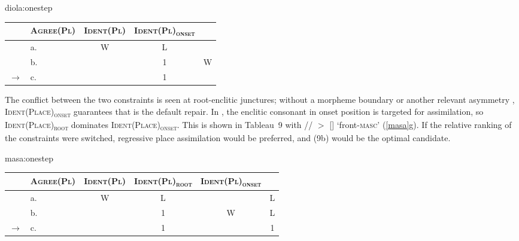 \documentclass[output=paper]{LSP/langsci}
\begin{document}
\begin{table}[ht]
    		{diola:onestep}
    \begin{tabular}{|rl||c|c:c|} \hline
     &
    	\textsc{Agree(Pl)} &
        \textsc{Ident(Pl)} &
        \textsc{Ident(Pl)\textsubscript{onset}}\\
    \hline \hline
	      & a.         & W & L &   \\ \hline
          & b.         &   & 1 & W \\ \hline
    $\to$ & c.         &   & 1 &   \\ \hline
    \end{tabular}
\end{table}

The conflict between the two  constraints is seen at root-enclitic junctures; without a morpheme boundary or another relevant asymmetry \citep{lamont2015}, \textsc{Ident(Place)\textsubscript{onset}} guarantees that  is the default repair. In , the enclitic consonant in onset position is targeted for assimilation, so \textsc{Ident(Place)\textsubscript{root}} dominates \textsc{Ident(Place)\textsubscript{onset}}. This is shown in Tableau~9 with // $>$ [] `front-\textsc{masc}' (\ref{masa}g). If the relative ranking of the  constraints were switched, regressive place assimilation would be preferred, and (9b) would be the optimal candidate.

\begin{table}[ht]
    		{masa:onestep}
    \begin{tabular}{|rl||c|c:c|c|} \hline
     &
    	\textsc{Agree(Pl)} &
        \textsc{Ident(Pl)} &
        \textsc{Ident(Pl)\textsubscript{root}} &
        \textsc{Ident(Pl)\textsubscript{onset}}\\
    \hline \hline
	      & a.         & W & L &   & L \\ \hline
          & b.         &   & 1 & W & L \\ \hline
    $\to$ & c.         &   & 1 &   & 1 \\ \hline
    \end{tabular}
\end{table}
\end{document}
